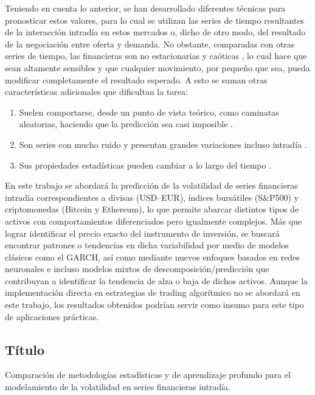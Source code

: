 \documentclass[12pt]{paper}
\begin{document}
Teniendo en cuenta lo anterior, se han desarrollado diferentes técnicas para pronosticar estos valores, para lo cual se utilizan las series de tiempo resultantes de la interacción intradía en estos mercados o, dicho de otro modo, del resultado de la negociación entre oferta y demanda. No obstante, comparadas con otras series de tiempo, las financieras son no estacionarias y caóticas \cite{Yaotang2000}, lo cual hace que sean altamente sensibles y que cualquier movimiento, por pequeño que sea, pueda modificar completamente el resultado esperado. A esto se suman otras características adicionales que dificultan la tarea:

\begin{enumerate}
    \item Suelen comportarse, desde un punto de vista teórico, como caminatas aleatorias, haciendo que la predicción sea casi imposible \cite{Hellstrom1998}.
    \item Son series con mucho ruido y presentan grandes variaciones incluso intradía \cite{MagdonIsmail1998}.
    \item Sus propiedades estadísticas pueden cambiar a lo largo del tiempo \cite{Hellstrom1998}.
\end{enumerate}

En este trabajo se abordará la predicción de la volatilidad de series financieras intradía correspondientes a divisas (USD--EUR), índices bursátiles (S\&P500) y criptomonedas (Bitcoin y Ethereum), lo que permite abarcar distintos tipos de activos con comportamientos diferenciados pero igualmente complejos. Más que lograr identificar el precio exacto del instrumento de inversión, se buscará encontrar patrones o tendencias en dicha variabilidad por medio de modelos clásicos como el GARCH, así como mediante nuevos enfoques basados en redes neuronales e incluso modelos mixtos de descomposición/predicción que contribuyan a identificar la tendencia de alza o baja de dichos activos. Aunque la implementación directa en estrategias de trading algorítmico no se abordará en este trabajo, los resultados obtenidos podrían servir como insumo para este tipo de aplicaciones prácticas.

\subsection[Titulo]{Título}
Comparación de metodologías estadísticas y de aprendizaje profundo para el modelamiento de la volatilidad en series financieras intradía.
\end{document}

